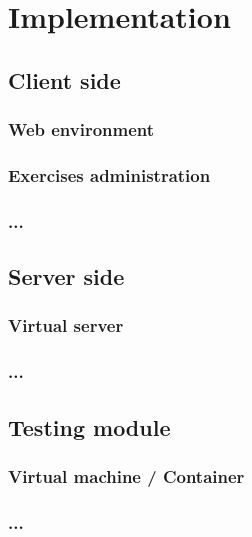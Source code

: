 \chapter[Implementation]{Implementation}

\label{ch:implementation}

\section{Client side}

\subsection{Web environment}

\subsection{Exercises administration}

\subsection{...}

\section{Server side}

\subsection{Virtual server}

\subsection{...}

\section{Testing module}

\subsection{Virtual machine / Container}

\subsection{...}